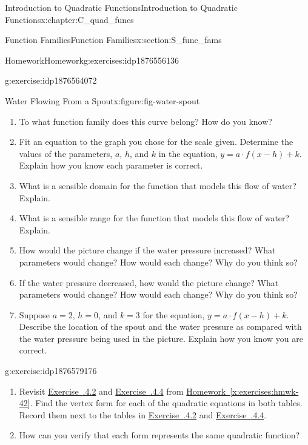 \documentclass[oneside,10pt,]{book}
\newcommand{\xreffont}{\relax}
\numberwithin{equation}{chapter}
\begin{document}
\begin{chapterptx}{Introduction to Quadratic Functions}{}{Introduction to Quadratic Functions}{}{}{x:chapter:C_quad_funcs}
\begin{sectionptx}{Function Families}{}{Function Families}{}{}{x:section:S_func_fams}
\begin{exercises-subsection}{Homework}{}{Homework}{}{}{g:exercises:idp1876556136}
\begin{divisionexercise}{4}{}{}{g:exercise:idp1876564072}
\begin{figureptx}{Water Flowing From a Spout}{x:figure:fig-water-spout}{}
\begin{image}{0.2}{0.6}{0.2}
\end{image}%
\tcblower
\end{figureptx}%
\begin{enumerate}[font=\bfseries,label=(\alph*),ref=\alph*]
\item{}To what function family does this curve belong? How do you know?%
\item{}Fit an equation to the graph you chose for the scale given. Determine the values of the parameters, \(a\), \(h\), and \(k\) in the equation, \(y = a \cdot f(x - h) + k\). Explain how you know each parameter is correct.%
\item{}What is a sensible domain for the function that models this flow of water? Explain.%
\item{}What is a sensible range for the function that models this flow of water? Explain.%
\item{}How would the picture change if the water pressure increased? What parameters would change? How would each change? Why do you think so?%
\item{}If the water pressure decreased, how would the picture change? What parameters would change? How would each change? Why do you think so?%
\item{}Suppose \(a=2\), \(h=0\), and \(k=3\) for the equation, \(y=a \cdot f(x-h)+k\). Describe the location of the spout and the water pressure as compared with the water pressure being used in the picture. Explain how you know you are correct.%
\end{enumerate}
\end{divisionexercise}%
\begin{divisionexercise}{5}{}{}{g:exercise:idp1876579176}%
\begin{enumerate}[font=\bfseries,label=(\alph*),ref=\alph*]
\item{}Revisit \hyperlink{x:exercise:exer-factored-eqs}{Exercise~{\xreffont 4.2.4.2}} and \hyperlink{x:exercise:exer-quad-funcs-stnd}{Exercise~{\xreffont 4.2.4.4}} from \hyperref[x:exercises:hmwk-42]{Homework~{\xreffont\ref{x:exercises:hmwk-42}}}. Find the vertex form for each of the quadratic equations in both tables. Record them next to the tables in \hyperlink{x:exercise:exer-factored-eqs}{Exercise~{\xreffont 4.2.4.2}} and \hyperlink{x:exercise:exer-quad-funcs-stnd}{Exercise~{\xreffont 4.2.4.4}}.%
\item{}How can you verify that each form represents the same quadratic function?%

\end{enumerate}
\end{divisionexercise}
\end{exercises-subsection}
\end{sectionptx}
\end{chapterptx}
\end{document}
